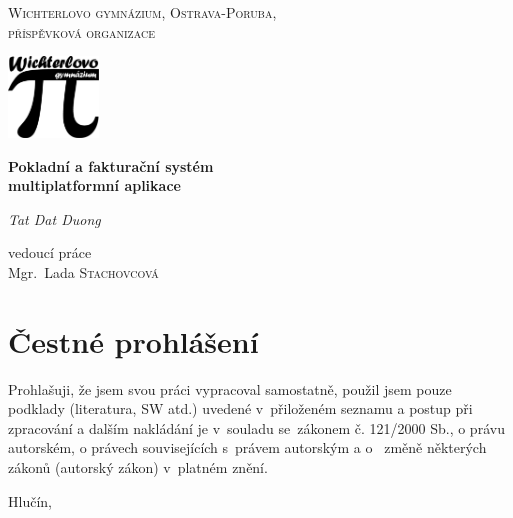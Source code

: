 \documentclass[a4paper,11pt,oneside]{article}
\begin{document}
\begin{titlepage}

\centering
{\scshape\large Wichterlovo gymnázium, Ostrava-Poruba,\\příspěvková organizace\par}
\vspace{1.2cm}
\includegraphics[width=0.18\textwidth]{../wigym}
\par
\vspace{2cm}
\vspace{1.5cm}
{\huge\bfseries Pokladní a fakturační systém\\multiplatformní aplikace\par}
\vspace{.3cm}
{\Large\itshape Tat Dat Duong\par}

\vfill
vedoucí práce\\
Mgr.~Lada \textsc{Stachovcová}
\vfill

{\large {}\par}
\pagebreak
\end{titlepage}

\vspace*{\fill}
\vspace*{\fill}

\section*{Čestné prohlášení}

Prohlašuji, že jsem svou práci vypracoval samostatně, použil jsem pouze podklady (literatura, SW atd.) uvedené v~přiloženém seznamu a postup při zpracování a dalším nakládání je v~souladu se~zákonem č. 121/2000 Sb., o právu autorském, o právech souvisejících s~právem autorským a o~ změně některých zákonů (autorský zákon) v~platném znění.

\bigskip

\noindent Hlučín, 

\vspace*{\fill}

\pagebreak
\pagestyle{fancy}

\tableofcontents
\end{document}

